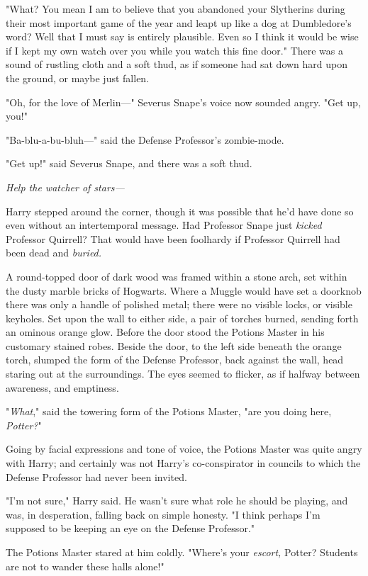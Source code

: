 "What? You mean I am to believe{\el} that you abandoned your
Slytherins{\el} during their most important{\el} game of the year{\el}
and leapt up like a dog{\el} at Dumbledore's word? Well that{\el} I must
say{\el} is entirely plausible. Even so{\el} I think it would be
wise{\el} if I kept my own watch over you{\el} while you watch this fine door."
There was a sound of rustling cloth and a soft thud, as if someone had sat down
hard upon the ground, or maybe just fallen.

"Oh, for the love of Merlin\mbox{---}" Severus Snape's voice now sounded angry. "Get
up, you!"

"Ba-blu-a-bu-bluh\mbox{---}" said the Defense Professor's zombie-mode.

"Get up!" said Severus Snape, and there was a soft thud.

\emph{Help the watcher of stars---}

Harry stepped around the corner, though it was possible that he'd have done so
even without an intertemporal message. Had Professor Snape just \emph{kicked}
Professor Quirrell? That would have been foolhardy if Professor Quirrell had
been dead and \emph{buried.}

A round-topped door of dark wood was framed within a stone arch, set within the
dusty marble bricks of Hogwarts. Where a Muggle would have set a doorknob there
was only a handle of polished metal; there were no visible locks, or visible
keyholes. Set upon the wall to either side, a pair of torches burned, sending
forth an ominous orange glow. Before the door stood the Potions Master in his
customary stained robes. Beside the door, to the left side beneath the orange
torch, slumped the form of the Defense Professor, back against the wall, head
staring out at the surroundings. The eyes seemed to flicker, as if halfway
between awareness, and emptiness.

"\emph{What}," said the towering form of the Potions Master, "are you doing
here, \emph{Potter?}"

Going by facial expressions and tone of voice, the Potions Master was quite
angry with Harry; and certainly was not Harry's co-conspirator in councils to
which the Defense Professor had never been invited.

"I'm not sure," Harry said. He wasn't sure what role he should be playing, and
was, in desperation, falling back on simple honesty. "I think perhaps I'm
supposed to be keeping an eye on the Defense Professor."

The Potions Master stared at him coldly. "Where's your \emph{escort,} Potter?
Students are not to wander these halls alone!"

